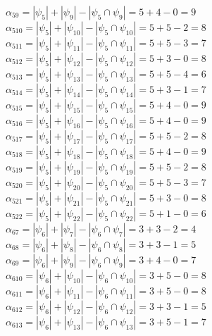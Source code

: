 \documentclass[a4paper,12pt]{article}
\begin{document}
$\alpha_{59} = |\psi_{5}| + |\psi_{9}| - |\psi_{5} \cap \psi_{9}| = 5 + 4 - 0 = 9$\\
$\alpha_{510} = |\psi_{5}| + |\psi_{10}| - |\psi_{5} \cap \psi_{10}| = 5 + 5 - 2 = 8$\\
$\alpha_{511} = |\psi_{5}| + |\psi_{11}| - |\psi_{5} \cap \psi_{11}| = 5 + 5 - 3 = 7$\\
$\alpha_{512} = |\psi_{5}| + |\psi_{12}| - |\psi_{5} \cap \psi_{12}| = 5 + 3 - 0 = 8$\\
$\alpha_{513} = |\psi_{5}| + |\psi_{13}| - |\psi_{5} \cap \psi_{13}| = 5 + 5 - 4 = 6$\\
$\alpha_{514} = |\psi_{5}| + |\psi_{14}| - |\psi_{5} \cap \psi_{14}| = 5 + 3 - 1 = 7$\\
$\alpha_{515} = |\psi_{5}| + |\psi_{15}| - |\psi_{5} \cap \psi_{15}| = 5 + 4 - 0 = 9$\\
$\alpha_{516} = |\psi_{5}| + |\psi_{16}| - |\psi_{5} \cap \psi_{16}| = 5 + 4 - 0 = 9$\\
$\alpha_{517} = |\psi_{5}| + |\psi_{17}| - |\psi_{5} \cap \psi_{17}| = 5 + 5 - 2 = 8$\\
$\alpha_{518} = |\psi_{5}| + |\psi_{18}| - |\psi_{5} \cap \psi_{18}| = 5 + 4 - 0 = 9$\\
$\alpha_{519} = |\psi_{5}| + |\psi_{19}| - |\psi_{5} \cap \psi_{19}| = 5 + 5 - 2 = 8$\\
$\alpha_{520} = |\psi_{5}| + |\psi_{20}| - |\psi_{5} \cap \psi_{20}| = 5 + 5 - 3 = 7$\\
$\alpha_{521} = |\psi_{5}| + |\psi_{21}| - |\psi_{5} \cap \psi_{21}| = 5 + 3 - 0 = 8$\\
$\alpha_{522} = |\psi_{5}| + |\psi_{22}| - |\psi_{5} \cap \psi_{22}| = 5 + 1 - 0 = 6$\\
$\alpha_{67} = |\psi_{6}| + |\psi_{7}| - |\psi_{6} \cap \psi_{7}| = 3 + 3 - 2 = 4$\\
$\alpha_{68} = |\psi_{6}| + |\psi_{8}| - |\psi_{6} \cap \psi_{8}| = 3 + 3 - 1 = 5$\\
$\alpha_{69} = |\psi_{6}| + |\psi_{9}| - |\psi_{6} \cap \psi_{9}| = 3 + 4 - 0 = 7$\\
$\alpha_{610} = |\psi_{6}| + |\psi_{10}| - |\psi_{6} \cap \psi_{10}| = 3 + 5 - 0 = 8$\\
$\alpha_{611} = |\psi_{6}| + |\psi_{11}| - |\psi_{6} \cap \psi_{11}| = 3 + 5 - 0 = 8$\\
$\alpha_{612} = |\psi_{6}| + |\psi_{12}| - |\psi_{6} \cap \psi_{12}| = 3 + 3 - 1 = 5$\\
$\alpha_{613} = |\psi_{6}| + |\psi_{13}| - |\psi_{6} \cap \psi_{13}| = 3 + 5 - 1 = 7$\\
\end{document}

